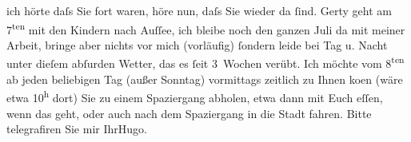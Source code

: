 \begin{ledgroupsized}[t]{13cm}
           ich hörte daſs Sie fort waren, höre nun, daſs Sie wieder da ſind.\pend
           \pstart
           Gerty geht am 7\textsuperscript{ten} mit den Kindern nach Auſſee, ich bleibe noch den
               ganzen Juli da mit {\pb}meiner Arbeit, bringe aber nichts vor mich (vorläufig) ſondern leide bei Tag u.
               Nacht unter dieſem abſurden Wetter, das es ſeit 3 Wochen verübt.\pend
           \pstart
           Ich möchte vom 8\textsuperscript{ten} ab jeden beliebigen Tag (außer Sonntag) vormittags zeitlich zu Ihnen ko{\geminationm}en (wäre etwa 10\textsuperscript{h} dort) Sie zu einem Spaziergang abholen, etwa dann mit Euch eſſen, wenn das
               geht, oder auch nach dem Spaziergang in die Stadt fahren. Bitte telegrafiren Sie mir
                  \label{T_L02345-1v}\label{T_L02345-1h}\pend
           \pstart Ihr\spacefill\mbox{Hugo.}\pend{}
         
         \endnumbering{}\end{ledgroupsized}  \newcommand{\dateiname}{L02345}\newcommand{\titel}{Hugo Hofmannsthal an Arthur Schnitzler, 2. 7. 1920}\newcommand{\editorInnen}{Martin Anton Müller und Gerd-Hermann Susen}
      
